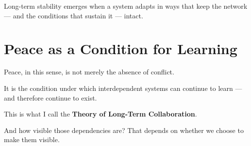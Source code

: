 \documentclass{article}
\begin{document}
Long-term stability emerges when a system adapts in ways that keep the network — and the conditions that sustain it — intact.

\section*{Peace as a Condition for Learning}

Peace, in this sense, is not merely the absence of conflict.

It is the condition under which interdependent systems can continue to learn — and therefore continue to exist.

This is what I call the \textbf{Theory of Long-Term Collaboration}.

And how visible those dependencies are?
That depends on whether we choose to make them visible.
\end{document}
